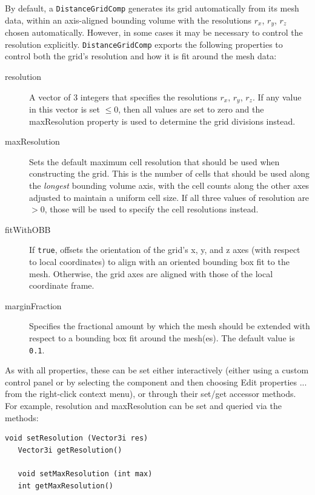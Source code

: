 By default, a {\tt DistanceGridComp} generates its grid automatically
from its mesh data, within an axis-aligned bounding volume with the
resolutions $r_x$, $r_y$, $r_z$ chosen automatically. However, in
some cases it may be necessary to control the resolution explicitly.
{\tt DistanceGridComp} exports the following properties to control
both the grid's resolution and how it is fit around the mesh data:

\begin{description}

\item[resolution] A vector of 3 integers that specifies the
resolutions $r_x$, $r_y$, $r_z$.  If any value in this vector is set
$\le 0$, then all values are set to zero and
the {\sf maxResolution} property is used to determine the grid
divisions instead.

\item[maxResolution] Sets the default maximum cell resolution that
should be used when constructing the grid. This is the number of cells
that should be used along the {\it longest} bounding volume axis, with the
cell counts along the other axes adjusted to maintain a uniform cell
size. If all three values of {\sf resolution} are $> 0$, those
will be used to specify the cell resolutions instead.

\item[fitWithOBB] If {\tt true}, offsets the orientation of the grid's
x, y, and z axes (with respect to local coordinates) to align with an
oriented bounding box fit to the mesh. Otherwise, the grid axes are
aligned with those of the local coordinate frame.

\item[marginFraction] Specifies the fractional amount by which the
mesh should be extended with respect to a bounding box fit around
the mesh(es). The default value is {\tt 0.1}.

\end{description}

As with all properties, these can be set either interactively (either
using a custom control panel or by selecting the component and then
choosing {\sf Edit properties ...} from the right-click context
menu), or through their set/get accessor methods.  For example, {\sf
resolution} and {\sf maxResolution} can be set and queried via the
methods:
%
\begin{lstlisting}[]
   void setResolution (Vector3i res)
   Vector3i getResolution()

   void setMaxResolution (int max)
   int getMaxResolution()
\end{lstlisting}

